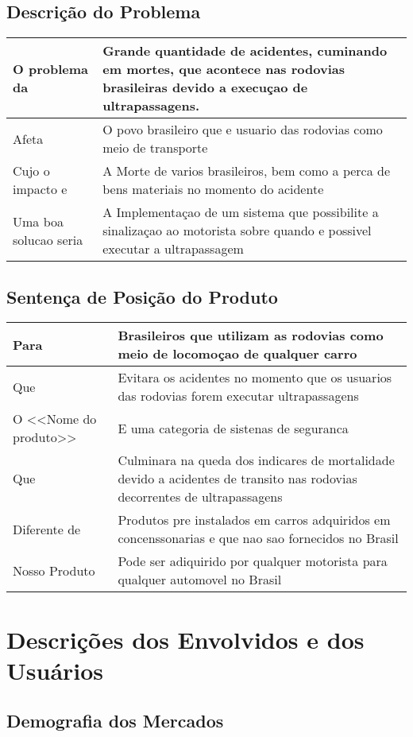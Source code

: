 \subsection{Descrição do Problema}
\begin{tabular}{| l |  p{7cm} |}
\hline
O problema da & Grande quantidade de acidentes, cuminando em mortes, que acontece nas rodovias brasileiras devido a execuçao de ultrapassagens.  \\
\hline
Afeta & O povo brasileiro que e usuario das rodovias como meio de transporte \\
\hline
Cujo o impacto e & A Morte de varios brasileiros, bem como a perca de bens materiais no momento do acidente\\
\hline
Uma boa solucao seria & A Implementaçao de um sistema que possibilite a sinalizaçao ao motorista sobre quando e possivel executar a ultrapassagem \\
\hline
\end{tabular}

\subsection{Sentença de Posição do Produto}
\begin{tabular}{| l |  p{7cm} |}
\hline
Para & Brasileiros que utilizam as rodovias como meio de locomoçao de qualquer carro \\
\hline
Que & Evitara os acidentes no momento que os usuarios das rodovias forem executar ultrapassagens \\
\hline
O <<Nome do produto>> & E uma categoria de sistenas de seguranca\\
\hline
Que & Culminara na queda dos indicares de mortalidade devido a acidentes de transito nas rodovias decorrentes de ultrapassagens \\
\hline
Diferente de & Produtos pre instalados em carros adquiridos em concenssonarias e que nao sao fornecidos no Brasil  \\
\hline
Nosso Produto & Pode ser adiquirido por qualquer motorista para qualquer automovel no Brasil\\
\hline
\end{tabular}


\section{Descrições dos Envolvidos e dos Usuários}

\subsection{Demografia dos Mercados}

